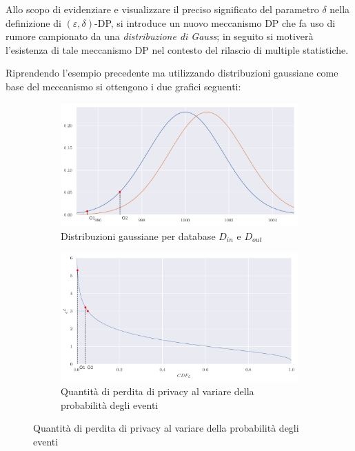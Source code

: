 Allo scopo di evidenziare e visualizzare il preciso significato del parametro $\delta$ nella definizione di $(\varepsilon, \delta)$-DP, si introduce un nuovo meccanismo DP che fa uso di rumore campionato da una \textit{distribuzione di Gauss}; in seguito si motiverà l'esistenza di tale meccanismo DP nel contesto del rilascio di multiple statistiche.

Riprendendo l'esempio precedente ma utilizzando distribuzioni gaussiane come base del meccanismo si ottengono i due grafici seguenti:

\begin{figure}[H]
    \begin{subfigure}[t]{.5\textwidth}
        \centering
        \includegraphics[width=\linewidth]{plots/normal_plrv_two_dists.pdf}
        \caption{Distribuzioni gaussiane per database $D_{in}$ e $D_{out}$}
        \label{plot:norm_plrv_two_dists}
    \end{subfigure}
    \begin{subfigure}[t]{.5\textwidth}
        \centering
        \includegraphics[width=\linewidth]{plots/normal_e^plrv.pdf}
        \caption{Quantità di perdita di privacy al variare della probabilità degli eventi}
        \label{plot:norm_e^prlv}
    \end{subfigure}
    \label{plot:plrv}
\end{figure}

